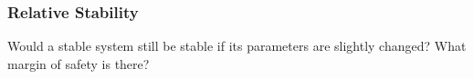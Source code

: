 \documentclass[12pt,letter]{article}
\numberwithin{ex}{section} %
\numberwithin{re}{section} %
\numberwithin{equation}{section}	%
\begin{document}
\subsubsection{Relative Stability}
Would a stable system still be stable if its parameters are slightly changed? What margin of safety is there?






	\pagebreak
	\renewcommand{\thepage}{}
	\renewcommand\refname{References Cited}
	\pagestyle{plain}
	
	
\end{document}
